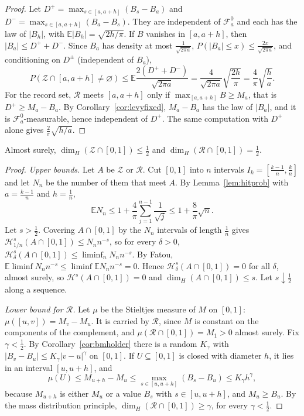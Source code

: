\begin{proof}
Let $D^+=\max_{s\in[a,a+h]}(B_s-B_a)$ and $D^-=\max_{s\in[a,a+h]}(B_a-B_s)$. They are independent of $\mathcal F^0_a$ and each has the law of $|B_h|$, with $\mathbb E|B_h|=\sqrt{2h/\pi}$. If $B$ vanishes in $[a,a+h]$,
then $|B_a|\le D^++D^-$. Since $B_a$ has density at most $\frac1{\sqrt{2\pi a}}$, $P(|B_a|\le x)\le\frac{2x}{\sqrt{2\pi a}}$, and conditioning on $D^\pm$ (independent of $B_a$),
\[
P(\mathcal Z\cap[a,a+h]\neq\varnothing)\le\mathbb E\frac{2(D^++D^-)}{\sqrt{2\pi a}}=\frac{4}{\sqrt{2\pi a}}\sqrt{\frac{2h}\pi}=\frac4\pi\sqrt{\frac ha}.
\]
For the record set, $\mathcal R$ meets $[a,a+h]$ only if $\max_{[a,a+h]}B\ge M_a$, that is $D^+\ge M_a-B_a$. By Corollary~\ref{cor:levyfixed}, $M_a-B_a$ has the law of $|B_a|$, and it is $\mathcal F^0_a$-measurable,
hence independent of $D^+$. The same computation with $D^+$ alone gives $\frac2\pi\sqrt{h/a}$.
\end{proof}

\begin{theorem}[Taylor, 1955]\label{thm:dimension}
Almost surely, $\dim_H(\mathcal Z\cap[0,1])\le\frac12$ and $\dim_H(\mathcal R\cap[0,1])=\frac12$.
\end{theorem}

\begin{proof}
\emph{Upper bounds.} Let $A$ be $\mathcal Z$ or $\mathcal R$. Cut $[0,1]$ into $n$ intervals $I_k=[\frac{k-1}n,\frac kn]$ and let $N_n$ be the number of them that meet $A$. By Lemma~\ref{lem:hitprob} with $a=\frac{k-1}n$ and
$h=\frac1n$,
\[
\mathbb E N_n\le1+\frac4\pi\sum_{j=1}^{n-1}\frac1{\sqrt j}\le1+\frac8\pi\sqrt n .
\]
Let $s>\frac12$. Covering $A\cap[0,1]$ by the $N_n$ intervals of length $\frac1n$ gives $\mathcal H^s_{1/n}(A\cap[0,1])\le N_nn^{-s}$, so for every $\delta>0$, $\mathcal H^s_\delta(A\cap[0,1])\le\liminf_nN_nn^{-s}$. By Fatou,
$\mathbb E\liminf N_nn^{-s}\le\liminf\mathbb E N_nn^{-s}=0$. Hence $\mathcal H^s_\delta(A\cap[0,1])=0$ for all $\delta$, almost surely, so $\mathcal H^s(A\cap[0,1])=0$ and $\dim_H(A\cap[0,1])\le s$. Let $s\downarrow\frac12$ along a sequence.

\emph{Lower bound for $\mathcal R$.} Let $\mu$ be the Stieltjes measure of $M$ on $[0,1]$: $\mu([u,v])=M_v-M_u$. It is carried by $\mathcal R$, since $M$ is constant on the components of the complement,
and $\mu(\mathcal R\cap[0,1])=M_1>0$ almost surely. Fix $\gamma<\frac12$. By Corollary~\ref{cor:bmholder} there is a random $K_\gamma$ with $|B_v-B_u|\le K_\gamma|v-u|^\gamma$ on $[0,1]$. If $U\subseteq[0,1]$ is closed with diameter $h$,
it lies in an interval $[u,u+h]$, and
\[
\mu(U)\le M_{u+h}-M_u\le\max_{s\in[u,u+h]}(B_s-B_u)\le K_\gamma h^\gamma,
\]
because $M_{u+h}$ is either $M_u$ or a value $B_s$ with $s\in[u,u+h]$, and $M_u\ge B_u$. By the mass distribution principle, $\dim_H(\mathcal R\cap[0,1])\ge\gamma$, for every $\gamma<\frac12$.
\end{proof}

